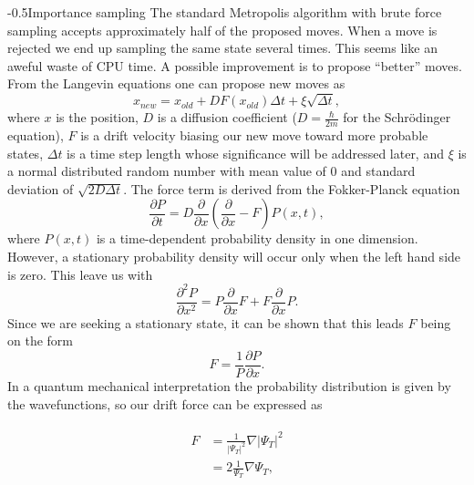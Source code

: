 \documentclass[english, a4paper]{article}
\makeatletter
\renewcommand{\subsubsection}{\@startsection{subsubsection}{3}{0pt}%
{-\baselineskip}{0.5\baselineskip}{\bf\large}}
\makeatother
\begin{document}
\subsubsection{Importance sampling} \label{importanceSampling}
The standard Metropolis algorithm with brute force sampling accepts approximately half of the proposed moves. 
When a move is rejected we end up sampling the same state several times. This seems like an aweful waste of CPU time.
A possible improvement is to propose   ``better'' moves. From the Langevin equations one can propose new moves as
\begin{equation}
	x_{new} = x_{old}+DF(x_{old})\Delta t +\xi\sqrt{\Delta t},	\label{importanceSamplingMove}
\end{equation}
where $x$ is the position, 
$D$ is a diffusion coefficient ($D=\frac{\hbar}{2m}$ for the Schr\"odinger equation), 
$F$ is a drift velocity biasing our new move toward more probable states, 
$\Delta t$ is a time step length whose significance will be addressed later, 
and $\xi$ is a normal distributed random number with mean value of 0 and standard deviation of $\sqrt{2D\Delta t}$. 
The force term is derived from the Fokker-Planck equation 
\begin{equation}
	\frac{\partial P}{\partial t} = D\frac{\partial }{\partial x}\left(\frac{\partial }{\partial x} -F\right)P(x,t),
\end{equation}
where $P(x,t)$ is a time-dependent probability density in one dimension. However, a stationary probability density will occur only when the left hand side is zero.
This leave us with
\begin{equation}
	\frac{\partial^2 P}{\partial {x^2}} = P\frac{\partial}{\partial {x}}F + F\frac{\partial}{\partial {x}}P.
\end{equation}
Since we are seeking a stationary state, it can be shown that this leads $F$ being on the form
\begin{equation}
	F = \frac{1}{P} \frac{\partial P}{\partial x}.
\end{equation}
In a quantum mechanical interpretation the probability distribution is given by the wavefunctions, so our drift force can be expressed as

\begin{align}
	\begin{split}
	F &= \frac{1}{|\Psi_T|^2}\nabla|\Psi_T|^2\\
	&= 2\frac{1}{\Psi_T}\nabla\Psi_T,
	\end{split}
\end{align}
\end{document}
